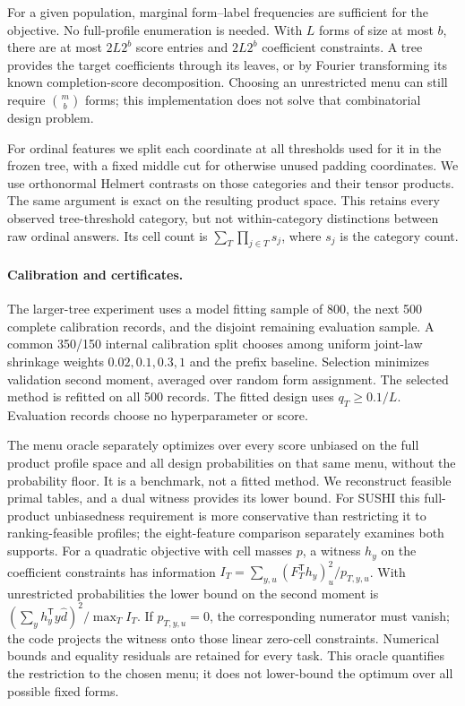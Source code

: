 For a given population, marginal form--label frequencies are sufficient for
the objective. No full-profile enumeration is needed. With $L$ forms of
size at most $b$, there are at most $2L2^b$ score entries and $2L2^b$
coefficient constraints. A tree provides the target coefficients through
its leaves, or by Fourier transforming its known completion-score
decomposition. Choosing an unrestricted menu can still require
$\binom mb$ forms; this implementation does not solve that combinatorial
design problem.

For ordinal features we split each coordinate at all thresholds used for it
in the frozen tree, with a fixed middle cut for otherwise unused padding
coordinates. We use orthonormal Helmert contrasts on those categories and
their tensor products. The same argument is exact on the resulting product
space. This retains every observed tree-threshold category, but not
within-category distinctions between raw ordinal answers. Its cell count
is $\sum_T\prod_{j\in T}s_j$, where $s_j$ is the category count.

\paragraph{Calibration and certificates.}
The larger-tree experiment uses a model fitting sample of
800, the next 500 complete calibration records, and the disjoint remaining
evaluation sample. A common 350/150 internal calibration split chooses
among uniform joint-law shrinkage weights $0.02,0.1,0.3,1$ and the prefix
baseline. Selection minimizes validation second moment, averaged over
random form assignment. The selected method is refitted on all 500 records.
The fitted design uses $q_T\ge0.1/L$. Evaluation records choose no
hyperparameter or score.

The menu oracle separately optimizes over every score unbiased on the full
product profile space and all design probabilities on that same menu,
without the probability floor.
It is a benchmark, not a fitted method. We reconstruct feasible primal
tables, and a dual witness provides its lower bound. For SUSHI this
full-product unbiasedness requirement is more conservative than restricting
it to ranking-feasible profiles; the eight-feature comparison separately
examines both supports. For a quadratic
objective with cell masses $p$, a witness $h_y$ on the coefficient constraints
has information
$I_T=\sum_{y,u}(F_T^{\mathsf T}h_y)_u^2/p_{T,y,u}$.
With unrestricted probabilities the lower bound on the second moment is
$(\sum_y h_y^{\mathsf T}y\widehat d)^2/\max_TI_T$.
If $p_{T,y,u}=0$, the corresponding numerator must vanish; the code projects
the witness onto those linear zero-cell constraints. Numerical bounds and
equality residuals are retained for every task. This oracle quantifies
the restriction to the chosen menu; it does not lower-bound the optimum
over all possible fixed forms.

